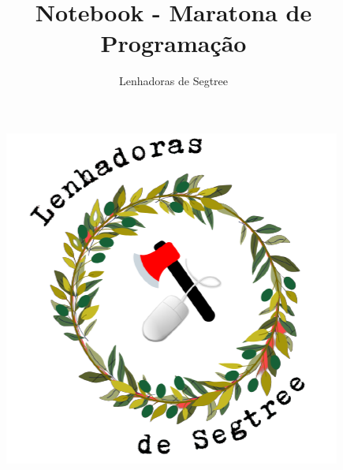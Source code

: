 \documentclass{article}
\title{Notebook - Maratona de Programação}
\author{Lenhadoras de Segtree}
\date{}
\begin{document}
\begin{figure}[t]
\includegraphics[scale=0.8]{lds.png}
\centering
\end{figure}
\maketitle
\end{document}
